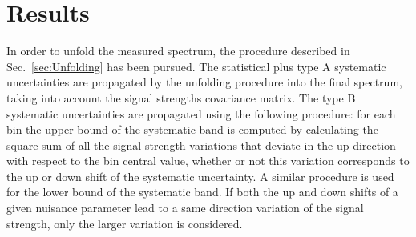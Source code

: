 \section{Results}
\label{sec:Results}

In order to unfold the measured spectrum, the procedure described in Sec.~\ref{sec:Unfolding} has been pursued.
The statistical plus type A systematic uncertainties are propagated by the unfolding procedure into the final spectrum, taking into account the signal strengths covariance matrix. The type B systematic uncertainties are propagated using the following procedure: for each \pth bin the upper bound of the systematic band is computed by calculating the square sum of all the signal strength variations that deviate in the up direction with respect to the bin central value, whether or not this variation corresponds to the up or down shift of the systematic uncertainty. A similar procedure is used for the lower bound of the systematic band. If both the up and down shifts of a given nuisance parameter lead to a same direction variation of the signal strength, only the larger variation is considered.

